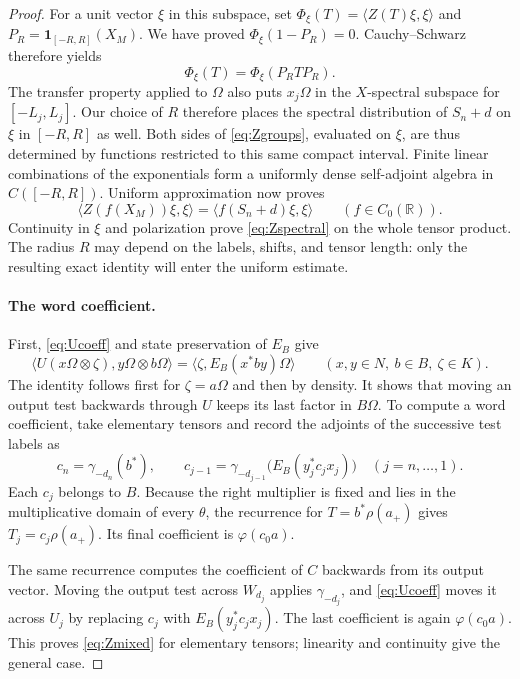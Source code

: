 \documentclass[11pt]{article}
\theoremstyle{definition}
\newcommand{\R}{\mathbb R}
\newcommand{\one}{\mathbf1}
\begin{document}
\begin{proof}
For a unit vector $\xi$ in this subspace, set
$\Phi_\xi(T)=\langle Z(T)\xi,\xi\rangle$ and
$P_R=\one_{[-R,R]}(X_M)$. We have proved $\Phi_\xi(1-P_R)=0$.
Cauchy--Schwarz therefore yields
\[
 \Phi_\xi(T)=\Phi_\xi(P_RTP_R).
\]
The transfer property applied to $\Omega$ also puts $x_j\Omega$ in the
$X$-spectral subspace for $[-L_j,L_j]$. Our choice of $R$ therefore places
the spectral distribution of $S_n+d$ on $\xi$ in $[-R,R]$ as well.
Both sides of \eqref{eq:Zgroups}, evaluated on $\xi$, are thus determined
by functions restricted to this same compact interval. Finite linear
combinations of the exponentials form a uniformly dense self-adjoint
algebra in $C([-R,R])$. Uniform approximation now proves
\[
 \langle Z(f(X_M))\xi,\xi\rangle
 =\langle f(S_n+d)\xi,\xi\rangle\qquad(f\in C_0(\R)).
\]
Continuity in $\xi$ and polarization prove \eqref{eq:Zspectral} on the
whole tensor product. The radius $R$ may depend on the labels, shifts, and
tensor length: only the resulting exact identity will enter the uniform
estimate.

\paragraph{The word coefficient.}
First, \eqref{eq:Ucoeff} and state preservation of $E_B$ give
\[
 \langle U(x\Omega\otimes\zeta),y\Omega\otimes b\Omega\rangle
 =\langle\zeta,E_B(x^*by)\Omega\rangle
 \qquad(x,y\in N,\ b\in B,\ \zeta\in K).
\]
The identity follows first for $\zeta=a\Omega$ and then by density.
It shows that moving an output test backwards through $U$ keeps its last
factor in $B\Omega$. To compute a word coefficient, take elementary
tensors and record the adjoints of the successive test labels as
\[
 c_n=\gamma_{-d_n}(b^*),\qquad
 c_{j-1}=\gamma_{-d_{j-1}}\bigl(E_B(y_j^*c_jx_j)\bigr)
 \quad(j=n,\ldots,1).
\]
Each $c_j$ belongs to $B$. Because the right multiplier is fixed and lies
in the multiplicative domain of every $\theta$, the recurrence for
$T=b^*\rho(a_+)$ gives $T_j=c_j\rho(a_+)$. Its final coefficient is
$\varphi(c_0a)$.

The same recurrence computes the coefficient of $C$ backwards from its
output vector. Moving the output test across $W_{d_j}$ applies
$\gamma_{-d_j}$, and \eqref{eq:Ucoeff} moves it across $U_j$ by replacing
$c_j$ with $E_B(y_j^*c_jx_j)$. The last coefficient is again
$\varphi(c_0a)$. This proves \eqref{eq:Zmixed} for elementary tensors;
linearity and continuity give the general case.
\end{proof}
\end{document}
